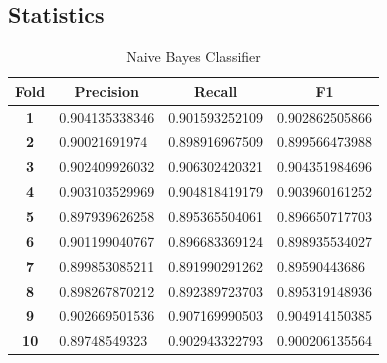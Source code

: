 \documentclass[paper=a4, fontsize=11pt]{jhwhw} %
\begin{document}
\subsection{Statistics}
\begin{table}[ht]
\centering
\caption{Naive Bayes Classifier}
\label{my-label}
\begin{tabular}{|c|l|l|l|}
\hline
\textbf{Fold} & \multicolumn{1}{c|}{\textbf{Precision}} & \multicolumn{1}{c|}{\textbf{Recall}} & \multicolumn{1}{c|}{\textbf{F1}} \\ \hline
\textbf{1}    & 0.904135338346                          & 0.901593252109                       & 0.902862505866                   \\ \hline
\textbf{2}    & 0.90021691974                           & 0.898916967509                       & 0.899566473988                   \\ \hline
\textbf{3}    & 0.902409926032                          & 0.906302420321                       & 0.904351984696                   \\ \hline
\textbf{4}    & 0.903103529969                          & 0.904818419179                       & 0.903960161252                   \\ \hline
\textbf{5}    & 0.897939626258                          & 0.895365504061                       & 0.896650717703                   \\ \hline
\textbf{6}    & 0.901199040767                          & 0.896683369124                       & 0.898935534027                   \\ \hline
\textbf{7}    & 0.899853085211                          & 0.891990291262                       & 0.89590443686                    \\ \hline
\textbf{8}    & 0.898267870212                          & 0.892389723703                       & 0.895319148936                   \\ \hline
\textbf{9}    & 0.902669501536                          & 0.907169990503                       & 0.904914150385                   \\ \hline
\textbf{10}   & 0.89748549323                           & 0.902943322793                       & 0.900206135564                   \\ \hline
\end{tabular}
\end{table}
\end{document}
